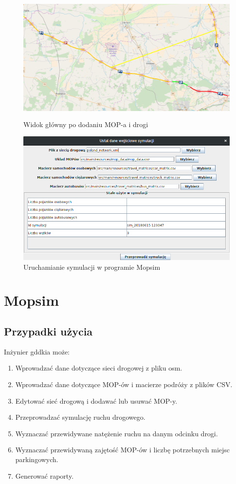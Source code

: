 \begin{figure}
  \begin{minipage}{.5\textwidth}
    \centering
    \includegraphics[width=.9\linewidth]{images/mopnik/dodany_mop_droga.png}
    \captionsetup{width=.9\linewidth}
    \caption{Widok główny po dodaniu MOP-a i drogi}
  \end{minipage}%
  \begin{minipage}{.5\textwidth}
    \centering
    \includegraphics[width=.9\linewidth]{images/mopnik/symulacje.png}
    \captionsetup{width=.9\linewidth}
    \caption{Uruchamianie symulacji w programie Mopsim}
  \end{minipage}
\end{figure}

\chapter{Mopsim}\label{r:Mopsim}

\section{Przypadki użycia}
Inżynier \acrshort{gddkia} może:
\begin{enumerate}
  \item Wprowadzać dane dotyczące sieci drogowej z pliku osm.
  \item Wprowadzać dane dotyczące MOP-ów i macierze podróży z plików CSV.
  \item Edytować sieć drogową i dodawać lub usuwać MOP-y.
  \item Przeprowadzać symulację ruchu drogowego.
  \item Wyznaczać przewidywane natężenie ruchu na danym odcinku drogi.
  \item Wyznaczać przewidywaną zajętość MOP-ów i liczbę potrzebnych miejsc parkingowych.
  \item Generować raporty.
\end{enumerate}

